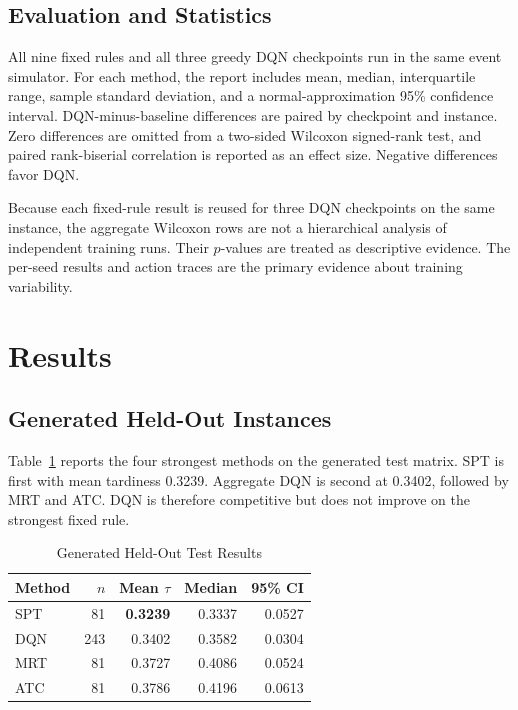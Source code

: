 \documentclass[conference]{IEEEtran}
\newcommand{\method}[1]{\textsc{#1}}
\newcommand{\dqn}{\method{DQN}}
\newcommand{\spt}{\method{SPT}}
\newcommand{\atc}{\method{ATC}}
\newcommand{\mrt}{\method{MRT}}
\begin{document}
\subsection{Evaluation and Statistics}

All nine fixed rules and all three greedy DQN checkpoints run in the same event simulator. For each method, the report includes mean, median, interquartile range, sample standard deviation, and a normal-approximation 95\% confidence interval. DQN-minus-baseline differences are paired by checkpoint and instance. Zero differences are omitted from a two-sided Wilcoxon signed-rank test, and paired rank-biserial correlation is reported as an effect size. Negative differences favor DQN.

Because each fixed-rule result is reused for three DQN checkpoints on the same instance, the aggregate Wilcoxon rows are not a hierarchical analysis of independent training runs. Their $p$-values are treated as descriptive evidence. The per-seed results and action traces are the primary evidence about training variability.

\section{Results}

\subsection{Generated Held-Out Instances}

Table~\ref{tab:generated} reports the four strongest methods on the generated test matrix. \spt{} is first with mean tardiness 0.3239. Aggregate DQN is second at 0.3402, followed by \mrt{} and \atc. DQN is therefore competitive but does not improve on the strongest fixed rule.

\begin{table}[t]
\caption{Generated Held-Out Test Results}
\label{tab:generated}
\centering
\footnotesize
\setlength{\tabcolsep}{3.6pt}
\begin{tabular}{lrrrr}
\toprule
Method & $n$ & Mean $\tau$ & Median & 95\% CI \\
\midrule
\spt & 81 & \textbf{0.3239} & 0.3337 & 0.0527 \\
\dqn & 243 & 0.3402 & 0.3582 & 0.0304 \\
\mrt & 81 & 0.3727 & 0.4086 & 0.0524 \\
\atc & 81 & 0.3786 & 0.4196 & 0.0613 \\
\bottomrule
\end{tabular}
\end{table}
\end{document}
